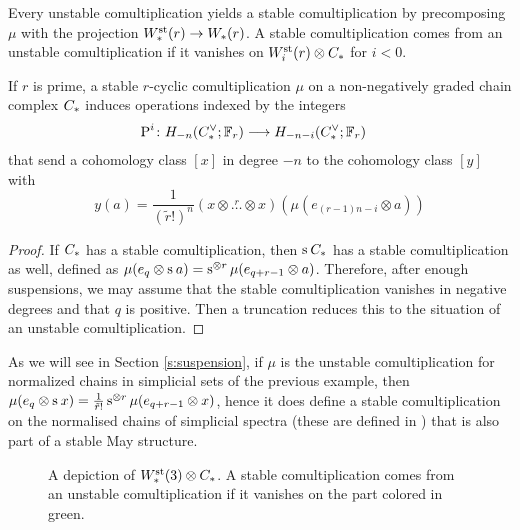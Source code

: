 Every unstable comultiplication yields a stable comultiplication by precomposing $\mu$ with the projection $\Wst(r)\to \W(r)$. A stable comultiplication comes from an unstable comultiplication if it vanishes on $\Wst[i](r)\otimes \ucadenas$ for $i<0$.

\begin{proposition}
	If $r$ is prime, a stable $r$-cyclic comultiplication $\mu$ on a non-negatively graded chain complex $\ucadenas$ induces operations indexed by the integers
	\begin{align*}
		\power^{i}\colon H_{-n}(\ucocadenas;\mathbb{F}_r)&\lra H_{-n-i}(\ucocadenas;\mathbb{F}_r)
	\end{align*}
	that send a cohomology class $[x]$ in degree $-n$ to the cohomology class $[y]$ with
	\[
	y(a) = \frac{1}{(\tilde{r}!)^n}(x\otimes \overset{r}{\ldots}\otimes x)(\mu(e_{(r-1)n-i}\otimes a))
	\]
\end{proposition}
\begin{proof} If $\ucadenas$ has a stable comultiplication, then $\sus{} \ucadenas$ has a stable comultiplication as well, defined as $\mu(e_q\otimes \sus{} a) = \sus{\otimes r}\mu(e_{q+r-1}\otimes a)$. Therefore, after enough suspensions, we may assume that the stable comultiplication vanishes in negative degrees and that $q$ is positive. Then a truncation reduces this to the situation of an unstable comultiplication.
\end{proof}
\begin{example}
	As we will see in Section \ref{s:suspension}, if $\mu$ is the unstable comultiplication for normalized chains in simplicial sets of the previous example, then $\mu(e_q\otimes \sus{} x) = \frac{1}{\tilde{r}!}\sus{\otimes r} \mu(e_{q+r-1}\otimes x)$, hence it does define a stable comultiplication on the normalised chains of simplicial spectra (these are defined in \cite{Gill2020}) that is also part of a stable May structure.
\end{example}


\begin{figure}

\caption{A depiction of $\Wst(3)\otimes \ucadenas$. A stable comultiplication comes from an unstable comultiplication if it vanishes on the part colored in green. }
\end{figure}



